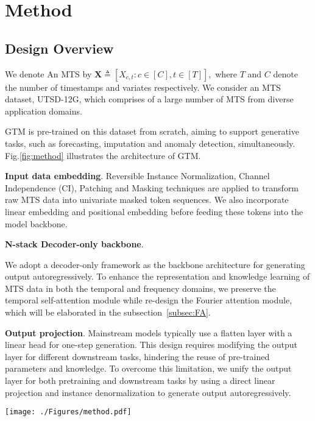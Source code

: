 \section{Method}
\label{sec:method}
\subsection{Design Overview}

We denote An MTS by 
$ 
\bm{X} 
\triangleq 
[X_{c,t}: c \in [C], t \in [T]] 
,
$ 
where $T$ and $C$ denote the number of timestamps 
and variates respectively.  
We consider an MTS dataset, UTSD-12G, which comprises of a large number of 
MTS from diverse application domains.   

GTM is pre-trained on this dataset from scratch, 
aiming to support generative tasks, such as forecasting, imputation and anomaly detection, simultaneously.  
Fig.\ref{fig:method} illustrates the architecture of GTM.  
 
\textbf{Input data embedding}. 
Reversible Instance Normalization\cite{Kim22}, 
Channel Independence (CI), Patching\cite{Nie23} and Masking\cite{Du22} techniques are applied 
to transform raw MTS data into univariate masked token sequences.  
We also incorporate linear embedding and positional embedding before feeding these tokens into the model backbone.  

\textbf{N-stack Decoder-only backbone}. 
 
We adopt a decoder-only framework as the backbone architecture for generating output autoregressively. 
To enhance the representation and knowledge learning of MTS data in both the temporal and frequency domains, we preserve the temporal self-attention module while re-design the Fourier attention module, which will be elaborated in the subsection~\ref{subsec:FA}.

\textbf{Output projection}. 
Mainstream models typically use a flatten layer with a linear head for one-step generation. This design requires modifying the output layer for different downstream tasks, hindering the reuse of pre-trained parameters and knowledge. To overcome this limitation, we unify the output layer for both pretraining and downstream tasks by using a direct linear projection and instance denormalization to generate output autoregressively.

\begin{figure*}[t]
\centering
\texttt{[image: ./Figures/method.pdf]} 
\vspace{-0.6cm} 
\caption{GTM model architecture for pre-training. \textbf{Left}: MTS data pass through three key components—input embedding, N-stack Transformer backbone, and output projection—to generate reconstruction results autoregressively. \textbf{Lower right}: Patching and masking processes using both full attention and causal attention mechanisms, adapted from the NLP field and optimized for MTS pre-training. \textbf{Upper right}: A novel knowledge attention module designed to learn representations of MTS data with varying time granularities.}
\vspace{-0.10in}
\label{fig:method}
\end{figure*}

